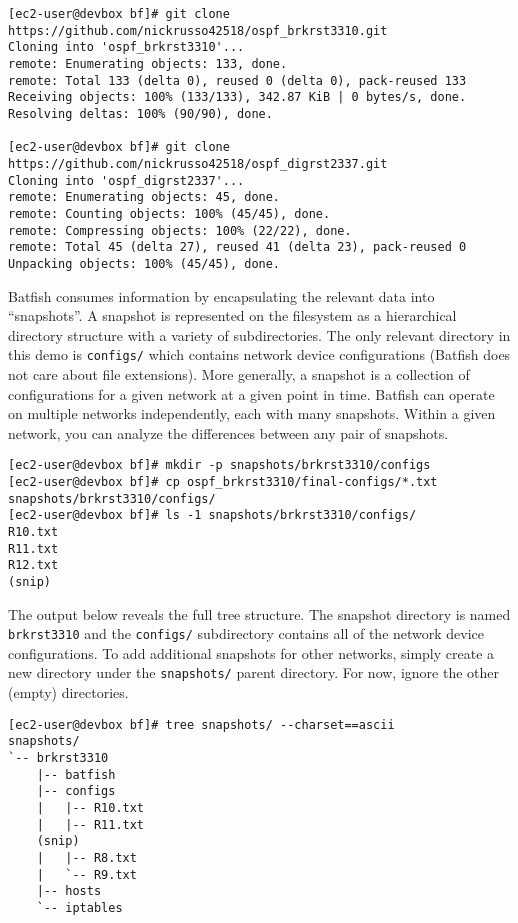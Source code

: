 \begin{verbatim}
[ec2-user@devbox bf]# git clone https://github.com/nickrusso42518/ospf_brkrst3310.git
Cloning into 'ospf_brkrst3310'...
remote: Enumerating objects: 133, done.
remote: Total 133 (delta 0), reused 0 (delta 0), pack-reused 133
Receiving objects: 100% (133/133), 342.87 KiB | 0 bytes/s, done.
Resolving deltas: 100% (90/90), done.

[ec2-user@devbox bf]# git clone https://github.com/nickrusso42518/ospf_digrst2337.git
Cloning into 'ospf_digrst2337'...
remote: Enumerating objects: 45, done.
remote: Counting objects: 100% (45/45), done.
remote: Compressing objects: 100% (22/22), done.
remote: Total 45 (delta 27), reused 41 (delta 23), pack-reused 0
Unpacking objects: 100% (45/45), done.
\end{verbatim}

Batfish consumes information by encapsulating the relevant data into
``snapshots''. A snapshot is represented on the filesystem as a
hierarchical directory structure with a variety of subdirectories. The
only relevant directory in this demo is \verb|configs/| which contains
network device configurations (Batfish does not care about file extensions).
More generally, a snapshot is a collection of configurations for a given
network at a given point in time. Batfish can operate on multiple networks
independently, each with many snapshots. Within a given network, you can
analyze the differences between any pair of snapshots.

\begin{verbatim}
[ec2-user@devbox bf]# mkdir -p snapshots/brkrst3310/configs
[ec2-user@devbox bf]# cp ospf_brkrst3310/final-configs/*.txt snapshots/brkrst3310/configs/
[ec2-user@devbox bf]# ls -1 snapshots/brkrst3310/configs/
R10.txt
R11.txt
R12.txt
(snip)
\end{verbatim}

The output below reveals the full tree structure. The snapshot directory
is named \verb|brkrst3310| and the \verb|configs/| subdirectory contains
all of the network device configurations. To add additional snapshots for
other networks, simply create a new directory under the \verb|snapshots/|
parent directory. For now, ignore the other (empty) directories.

\begin{verbatim}
[ec2-user@devbox bf]# tree snapshots/ --charset==ascii
snapshots/
`-- brkrst3310
    |-- batfish
    |-- configs
    |   |-- R10.txt
    |   |-- R11.txt
    (snip)
    |   |-- R8.txt
    |   `-- R9.txt
    |-- hosts
    `-- iptables
\end{verbatim}

